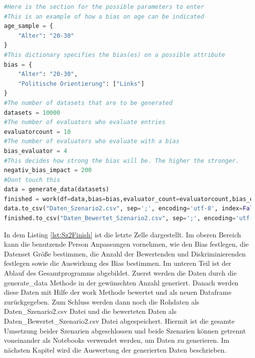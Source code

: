 \begin{onehalfspace}
\begin{lstlisting}[language=Python,label={lst:Sz2Finish},caption=Letzte Zelle des zweiten Szenario für die Interaktion des Benutzenden]
#Here is the section for the possible parameters to enter
#This is an example of how a bias on age can be indicated
age_sample = {
    "Alter": "20-30"
}
#This dictionary specifies the bias(es) on a possible attribute
bias = {
    "Alter": "20-30",
    "Politische Orientierung": ["Links"]
}
#The number of datasets that are to be generated
datasets = 10000
#The number of evaluators who evaluate entries
evaluatorcount = 10
#The number of evaluators who evaluate with a bias
bias_evaluator = 4
#This decides how strong the bias will be. The higher the stronger.
negativ_bias_impact = 200
#Dont touch this
data = generate_data(datasets)
finished = work(df=data,bias=bias,evaluator_count=evaluatorcount,bias_evaluator=bias_evaluator,bias_neg=negativ_bias_impact)
data.to_csv("Daten_Szenario2.csv", sep=';', encoding='utf-8', index=False)
finished.to_csv("Daten_Bewertet_Szenario2.csv", sep=';', encoding='utf-8', index=False)
\end{lstlisting}
In dem Listing \ref{lst:Sz2Finish} ist die letzte Zelle dargestellt. Im oberen Bereich kann die benutzende Person Anpassungen vornehmen, wie den Bias festlegen, die Datenset Größe bestimmen, die Anzahl der Bewertenden und Diskriminierenden festlegen sowie die Auswirkung des Bias bestimmen. Im unteren Teil ist der Ablauf des Gesamtprogramms abgebildet. Zuerst werden die Daten durch die \glqq{}generate\_data\grqq{} Methode in der gewünschten Anzahl generiert. Danach werden diese Daten mit Hilfe der \glqq{}work\grqq{} Methode bewertet und als neuen Dataframe zurückgegeben. Zum Schluss werden dann noch die Rohdaten als \glqq{}Daten\_Szenario2.csv\grqq{} Datei und die bewerteten Daten als \glqq{}Daten\_Bewertet\_Szenario2.csv\grqq{} Datei abgespeichert.
Hiermit ist die gesamte Umsetzung beider Szenarien abgeschlossen und beide Szenarien können getrennt voneinander als Notebooks verwendet werden, um Daten zu generieren. Im nächsten Kapitel wird die Auswertung der generierten Daten beschrieben.
\newpage

\end{onehalfspace}
